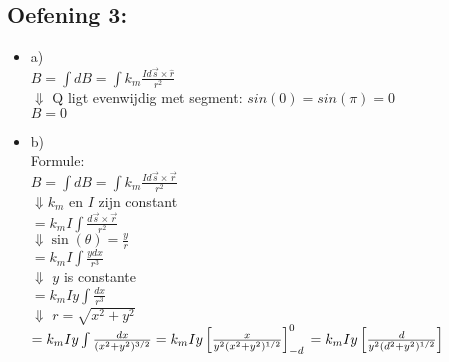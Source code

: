 \documentclass[../Oefenzitting4.tex]{subfiles}
\begin{document}
  \subsection{Oefening 3:}
    \begin{itemize}
      \item a) \\
        $
          B = \int dB = \int k_{m} \frac{I d\vec{s} \times \hat{r}}{r^{2}}
        $ \\
          $\Downarrow $ Q ligt evenwijdig met segment: $ sin(0) = sin(\pi) = 0 $
          \\
        $
          B = 0
        $
      \item b) \\
        Formule: \\
          $
            B = \int dB = \int k_{m} \frac{I d\vec{s} \times \vec{r}}{r^{2}}
          $
        \\
        $\Downarrow$$k_{m}$ en $I$ zijn constant
        \\
        $
          = k_{m}I \int \frac{d\vec{s} \times \vec{r}}{r^{2}}
        $
        \\
        $\Downarrow$$\sin(\theta) = \frac{y}{r}$
        \\
        $
          = k_{m}I \int \frac{ydx}{r^{3}}
        $
        \\
        $\Downarrow$ $y$ is constante
        \\
        $
          = k_{m}Iy \int \frac{dx}{r^{3}}
        $
        \\
        $\Downarrow$ $r= \sqrt{x^{2}+y^{2}}$
        \\
        $
          = k_{m}Iy \int \frac{dx}{(x^{2}+y^{2})^{3/2}}
          \\
          = k_{m}Iy \left[ \frac{x}{y^{2}(x^{2} + y^{2})^{1/2}}  \right]^{0}_{-d}
          \\
          = k_{m}Iy \left[ \frac{d}{y^{2}(d^{2} + y^{2})^{1/2}}  \right]
        $

    \end{itemize}
\end{document}
